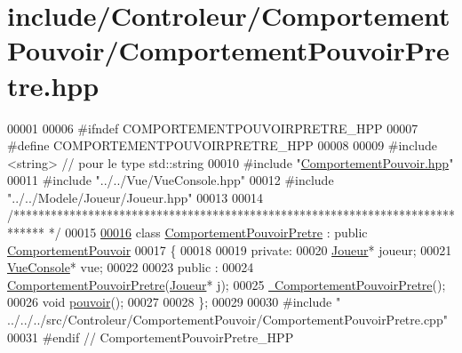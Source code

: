 \hypertarget{_comportement_pouvoir_pretre_8hpp_source}{\section{include/\-Controleur/\-Comportement\-Pouvoir/\-Comportement\-Pouvoir\-Pretre.hpp}
}

\begin{DoxyCode}
00001 
00006 \textcolor{preprocessor}{#ifndef COMPORTEMENTPOUVOIRPRETRE\_HPP}
00007 \textcolor{preprocessor}{}\textcolor{preprocessor}{#define COMPORTEMENTPOUVOIRPRETRE\_HPP}
00008 \textcolor{preprocessor}{}
00009 \textcolor{preprocessor}{#include <string>} \textcolor{comment}{// pour le type std::string}
00010 \textcolor{preprocessor}{#include "\hyperlink{_comportement_pouvoir_8hpp}{ComportementPouvoir.hpp}"}
00011 \textcolor{preprocessor}{#include "../../Vue/VueConsole.hpp"}
00012 \textcolor{preprocessor}{#include "../../Modele/Joueur/Joueur.hpp"}
00013 
00014 \textcolor{comment}{/*****************************************************************************
      */}
00015 
\hypertarget{_comportement_pouvoir_pretre_8hpp_source_l00016}{}\hyperlink{class_comportement_pouvoir_pretre}{00016} \textcolor{keyword}{class }\hyperlink{class_comportement_pouvoir_pretre}{ComportementPouvoirPretre} : \textcolor{keyword}{public} \hyperlink{class_comportement_pouvoir}{ComportementPouvoir}
00017 \{
00018 
00019    \textcolor{keyword}{private}:
00020     \hyperlink{class_joueur}{Joueur}* joueur;
00021   \hyperlink{class_vue_console}{VueConsole}* vue;
00022 
00023    \textcolor{keyword}{public} :
00024       \hyperlink{class_comportement_pouvoir_pretre_a997a0441eabec5c50a1cfa29d9aabdaa}{ComportementPouvoirPretre}(\hyperlink{class_joueur}{Joueur}* j);
00025       \hyperlink{class_comportement_pouvoir_pretre_a5232928218a13a88d8f1d4aecf440147}{~ComportementPouvoirPretre}();
00026       \textcolor{keywordtype}{void} \hyperlink{class_comportement_pouvoir_pretre_a24e87d9b2cb5ab4116d67ace5d3c9687}{pouvoir}();
00027     
00028 \};
00029 
00030 \textcolor{preprocessor}{#include "
      ../../../src/Controleur/ComportementPouvoir/ComportementPouvoirPretre.cpp"}
00031 \textcolor{preprocessor}{#endif // ComportementPouvoirPretre\_HPP}
\end{DoxyCode}
